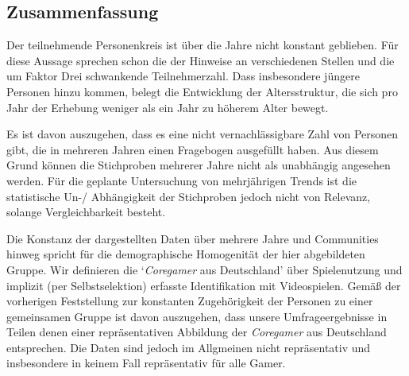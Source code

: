 \documentclass[11pt]{scrartcl}
\begin{document}
\subsection{Zusammenfassung}

Der teilnehmende Personenkreis ist über die Jahre nicht konstant geblieben.
Für diese Aussage sprechen schon die der Hinweise an verschiedenen Stellen
und die um Faktor Drei schwankende Teilnehmerzahl.
Dass insbesondere jüngere Personen hinzu kommen,
belegt die Entwicklung der Altersstruktur,
die sich pro Jahr der Erhebung weniger als ein Jahr zu höherem Alter bewegt.

Es ist davon auszugehen, dass es eine nicht vernachlässigbare
Zahl von Personen gibt,
die in mehreren Jahren einen Fragebogen ausgefüllt haben.
Aus diesem Grund können die Stichproben mehrerer Jahre
nicht als unabhängig angesehen werden.
Für die geplante Untersuchung von mehrjährigen Trends
ist die statistische Un-/ Abhängigkeit der Stichproben jedoch nicht von Relevanz,
solange Vergleichbarkeit besteht.

Die Konstanz der dargestellten Daten
über mehrere Jahre und Communities hinweg spricht für die
demographische Homogenität der hier abgebildeten Gruppe.
Wir definieren die `\emph{Coregamer} aus Deutschland'
über Spielenutzung und implizit (per Selbstselektion)
erfasste Identifikation mit Videospielen.
Gemäß der vorherigen Feststellung zur konstanten Zugehörigkeit
der Personen zu einer gemeinsamen Gruppe ist davon auszugehen,
dass unsere Umfrageergebnisse in Teilen denen
einer repräsentativen Abbildung der
\emph{Coregamer} aus Deutschland entsprechen.
Die Daten sind jedoch im Allgmeinen nicht repräsentativ
und insbesondere in keinem Fall repräsentativ für alle Gamer.


\clearpage
{}

\end{document}
